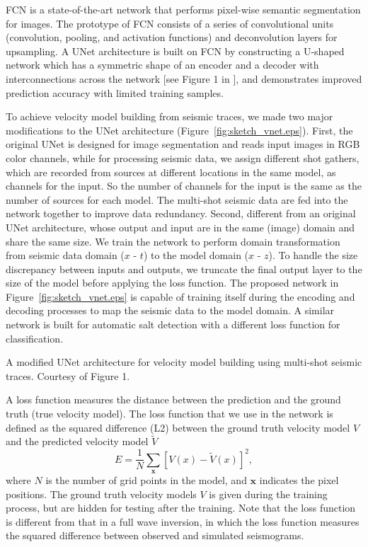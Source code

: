 \documentclass{segabs}
\begin{document}
FCN is a state-of-the-art network that performs pixel-wise semantic segmentation for images. The prototype of FCN consists of a series of convolutional units (convolution, pooling, and activation functions) and deconvolution layers for upsampling. A UNet architecture \citep{ronneberger15} is built on FCN by constructing a U-shaped network which has a symmetric shape of an encoder and a decoder with interconnections across the network [see Figure 1 in \citet{ronneberger15}], and demonstrates improved prediction accuracy with limited training samples. 

To achieve velocity model building from seismic traces, we made two major modifications to the UNet architecture (Figure~\ref{fig:sketch_vnet.eps}).
First, the original UNet is designed for image segmentation and reads input images in RGB color channels, while for processing seismic data, we assign different shot gathers, which are recorded from sources at different locations in the same model, as channels for the input. So the number of channels for the input is the same as the number of sources for each model. The multi-shot seismic data are fed into the network together to improve data redundancy. Second, different from an original UNet architecture, whose output and input are in the same (image) domain and share the same size. We train the network to perform domain transformation from seismic data domain ($x$ - $t$) to the model domain ($x$ - $z$). To handle the size discrepancy between inputs and outputs, we truncate the final output layer to the size of the model before applying the loss function. The proposed network in Figure~\ref{fig:sketch_vnet.eps} is capable of training itself during the encoding and decoding processes to map the seismic data to the model domain.
A similar network is built for automatic salt detection \citep{wenlong18_salt} with a different loss function for classification. 

{A modified UNet architecture for velocity model building using multi-shot seismic traces. Courtesy of \citet{ronneberger15} Figure 1.}

A loss function measures the distance between the prediction and the ground truth (true velocity model). The loss function that we use in the network is defined as the squared difference (L2) between the ground truth velocity model $V$ and the predicted velocity model $\tilde{V}$
\begin{equation}
E = \frac{1}{N}\sum_{\boldsymbol{x}} [V(x)-\tilde{V}(x)]^2,
\label{loss}
\end{equation}
where $N$ is the number of grid points in the model, and $\boldsymbol{x}$ indicates the pixel positions. The ground truth velocity models $V$ is given during the training process, but are hidden for testing after the training. Note that the loss function is different from that in a full wave inversion, in which the loss function measures the squared difference between observed and simulated seismograms.
\end{document}
